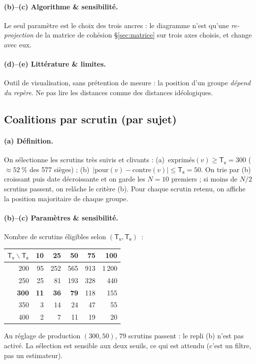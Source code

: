\documentclass[11pt,a4paper]{article}
\newcommand{\param}[1]{\ensuremath{\mathsf{#1}}}
\begin{document}
\paragraph{(b)--(c) Algorithme \& sensibilité.} Le seul \og{}paramètre\fg{} est le
choix des trois ancres : le diagramme n'est qu'une \emph{re-projection} de la
matrice de cohésion §\ref{sec:matrice} sur trois axes choisis, et change avec eux.

\paragraph{(d)--(e) Littérature \& limites.} Outil de visualisation, sans
prétention de mesure : la position d'un groupe \emph{dépend du repère}. Ne pas lire
les distances comme des distances idéologiques.

\subsection{Coalitions par scrutin (par sujet)}\label{sec:coalitions}

\paragraph{(a) Définition.} On sélectionne les scrutins \og{}très suivis et
clivants\fg{} : (a)~$\text{exprimés}(v)\ge \param{T_v}=300$
($\approx 52~\%$ des 577 sièges) ; (b)~$|\mathrm{pour}(v)-\mathrm{contre}(v)|\le \param{T_e}=50$.
On trie par (b) croissant puis date décroissante et on garde les $N=10$ premiers ;
si moins de $N/2$ scrutins passent, on relâche le critère (b). Pour chaque scrutin
retenu, on affiche la position majoritaire de chaque groupe.

\paragraph{(b)--(c) Paramètres \& sensibilité.} Nombre de scrutins éligibles selon
$(\param{T_v},\param{T_e})$~:
\begin{center}\small
\begin{tabular}{r|rrrrr}
\toprule
$\param{T_v}\backslash\param{T_e}$ & 10 & 25 & 50 & 75 & 100 \\
\midrule
200 & \phantom{0}95 & 252 & 565 & 913 & 1\,200 \\
250 & \phantom{0}25 & \phantom{0}81 & 193 & 328 & \phantom{0,}440 \\
\textbf{300} & \phantom{0}\textbf{11} & \phantom{0}\textbf{36} & \phantom{00}\textbf{79} & 118 & \phantom{0,}155 \\
350 & \phantom{00}3 & \phantom{0}14 & \phantom{00}24 & \phantom{0}47 & \phantom{0,0}55 \\
400 & \phantom{00}2 & \phantom{00}7 & \phantom{00}11 & \phantom{0}19 & \phantom{0,0}20 \\
\bottomrule
\end{tabular}
\end{center}
Au réglage de production $(300,50)$, $79$ scrutins passent : le repli (b) n'est pas
activé. La sélection est sensible aux deux seuils, ce qui est attendu (c'est un
filtre, pas un estimateur).
\end{document}
